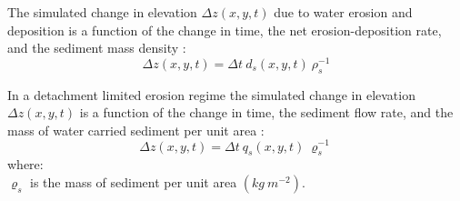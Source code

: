 \documentclass[esurf, manuscript]{copernicus}
\begin{document}
The simulated change in elevation $\Delta z(x,y,t)$ due to water erosion and deposition
is a function of
the change in time, the net erosion-deposition rate, and the sediment mass density 
\citep{Mitasova2013}:
\begin{equation}
\label{eq:evolution} 
{\Delta z(x,y,t) = \Delta t ~ d_s(x,y,t) ~ \rho_s^{-1} }
\end{equation}


In a detachment limited erosion regime
the simulated change in elevation $\Delta z(x,y,t)$
is a function of
the change in time, the sediment flow rate, and the mass of water carried sediment per unit area
\citep{Mitasova2013}:
\begin{equation}
\label{eq:flux_evolution} 
{\Delta z(x,y,t) = \Delta t ~ q_s(x,y,t) ~ \varrho_s^{-1} } 
\end{equation}
{\small
\noindent
where: \\
\noindent
\hspace*{0.5em} $\varrho_s$ is the mass of sediment per unit area $(kg ~ m^{-2})$.\\
}

\end{document}
